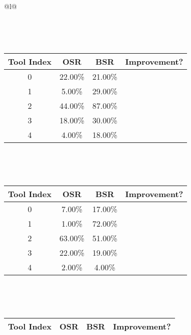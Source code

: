 \begin{longtable}{@{}l@{}}
\begin{minipage}{\textwidth}
\end{minipage}\\[2ex]
\begin{minipage}{\textwidth}
\centering\vspace{2ex}
\\[0.8ex]
\begin{tabular}{|c|c|c|c|} \hline
\textbf{Tool Index} & \textbf{OSR} & \textbf{ BSR} & \textbf{Improvement?} \\ \hline
0 & 22.00\% & 21.00\% & \textcolor{red}{\ding{55}} \\ \hline
1 & 5.00\% & 29.00\% & \textcolor{green}{\ding{51}} \\ \hline
2 & 44.00\% & 87.00\% & \textcolor{green}{\ding{51}} \\ \hline
3 & 18.00\% & 30.00\% & \textcolor{green}{\ding{51}} \\ \hline
4 & 4.00\% & 18.00\% & \textcolor{green}{\ding{51}} \\ \hline
\end{tabular}
\end{minipage}\\[2ex]
\begin{minipage}{\textwidth}
\centering\vspace{2ex}
\\[0.8ex]
\begin{tabular}{|c|c|c|c|} \hline
\textbf{Tool Index} & \textbf{OSR} & \textbf{ BSR} & \textbf{Improvement?} \\ \hline
0 & 7.00\% & 17.00\% & \textcolor{green}{\ding{51}} \\ \hline
1 & 1.00\% & 72.00\% & \textcolor{green}{\ding{51}} \\ \hline
2 & 63.00\% & 51.00\% & \textcolor{red}{\ding{55}} \\ \hline
3 & 22.00\% & 19.00\% & \textcolor{red}{\ding{55}} \\ \hline
4 & 2.00\% & 4.00\% & \textcolor{green}{\ding{51}} \\ \hline
\end{tabular}
\end{minipage}\\[2ex]
\begin{minipage}{\textwidth}
\centering\vspace{2ex}
\\[0.8ex]
\begin{tabular}{|c|c|c|c|} \hline
\textbf{Tool Index} & \textbf{OSR} & \textbf{ BSR} & \textbf{Improvement?} \\ \hline

\end{tabular}
\end{minipage}
\end{longtable}
